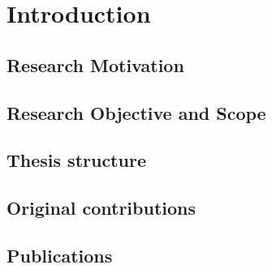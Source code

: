 %
%
\chapter{Introduction} \label{chap:introduction}

\section{Research Motivation}

\section{Research Objective and Scope}\label{sec:scope}


\section{Thesis structure}

\section{Original contributions}

\section{Publications}


\clearpage
